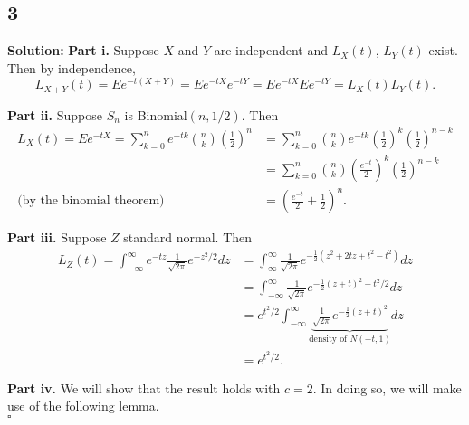 \documentclass[12pt]{article}
\newcounter{ProofCounter}
\newenvironment{Solution}{\stepcounter{ProofCounter}\textbf{Solution:}}{\hfill$\square$}
\begin{document}

\newpage
\subsection*{3}
\begin{Solution}
  \textbf{Part i.} Suppose $X$ and $Y$ are independent and $L_X(t)$, $L_Y(t)$ exist. Then by independence,
  \[
    L_{X + Y}(t) = Ee^{-t(X + Y)} = Ee^{-tX}e^{-tY} = Ee^{-tX}Ee^{-tY} = L_X(t) L_Y(t).
  \]

  \textbf{Part ii.} Suppose $S_n$ is Binomial$(n, 1/2)$. Then
  \begin{align*}
    L_{X}(t) = Ee^{-tX} = \sum_{k=0}^{n} e^{-tk} \binom{n}{k} \left( \frac{1}{2} \right)^n & = \sum_{k=0}^{n} \binom{n}{k} e^{-tk} \left( \frac{1}{2} \right)^k \left( \frac{1}{2} \right)^{n-k} \\
    & = \sum_{k=0}^{n} \binom{n}{k} \left( \frac{e^{-t}}{2} \right)^k \left( \frac{1}{2} \right)^{n-k} \\
    \text{(by the binomial theorem)} \ \ \ & = \left( \frac{e^{-t}}{2} + \frac{1}{2} \right)^{n}.
  \end{align*}

  \textbf{Part iii.} Suppose $Z$ standard normal. Then
  \begin{align*}
    L_Z(t) = \int_{-\infty}^{\infty} e^{-tz} \frac{1}{\sqrt{2\pi}} e^{-z^2 / 2} dz & = \int_{\infty}^{\infty} \frac{1}{\sqrt{2\pi}} e^{-\frac{1}{2}(z^2 + 2tz + t^2 - t^2)} dz \\
    & = \int_{-\infty}^{\infty} \frac{1}{\sqrt{2\pi}} e^{-\frac{1}{2}(z + t)^2 + t^2 / 2} dz \\
    & = e^{t^2 / 2} \int_{-\infty}^{\infty}\underbrace{ \frac{1}{\sqrt{2\pi}} e^{-\frac{1}{2}(z + t)^2} }_{\text{density of $N(-t, 1)$}} dz \\
    & = e^{t^2 / 2}.
  \end{align*}

  \textbf{Part iv.} We will show that the result holds with $c = 2$. In doing so, we will make use of the following lemma. \\


\end{Solution}
\end{document}
